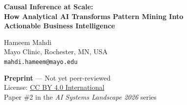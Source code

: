 \documentclass[12pt, a4paper]{article}
\begin{document}
\begin{center}
    {\Large\bfseries Causal Inference at Scale:\\[4pt]
    How Analytical AI Transforms Pattern Mining Into\\[2pt]
    Actionable Business Intelligence}

    \vspace{1em}

    {\large Hameem Mahdi~}\\[4pt]
    Mayo Clinic, Rochester, MN, USA\\
    \texttt{mahdi.hameem@mayo.edu}

    \vspace{1em}

    {\small\textbf{Preprint} — Not yet peer-reviewed}\\[2pt]
    {\small License: \href{https://creativecommons.org/licenses/by/4.0/}{CC BY 4.0 International}}\\[2pt]
    {\small Paper \#2 in the \emph{AI Systems Landscape 2026} series}
\end{center}

\vspace{1em}
\end{document}
